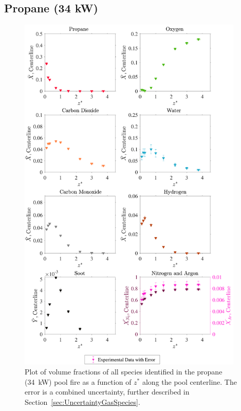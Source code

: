 \documentclass[12pt]{article}
\begin{document}
\subsection{Propane (34 kW)}
\label{ssec:Propane34kW_ALL_Vol_Frac}
\begin{figure}[!h]
	\centering
\includegraphics[width=10.75cm,keepaspectratio]{Propane 34KW_MOL_FRAC_Plot.pdf}
	\caption[Volume fractions of major species in the propane (34 kW) plume]{Plot of volume fractions of all species identified in the propane (34~kW) pool fire as a function of $z^{*}$ along the pool centerline. The error is a combined uncertainty, further described in Section~\ref{sec:UncertaintyGasSpecies}.}
	\label{fig:Propane20kW_VOL_Frac_Major}
\end{figure}
\end{document}
